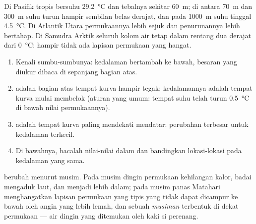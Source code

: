 Di Pasifik tropis  bersuhu \qty{29.2}{\degreeCelsius} dan
tebalnya sekitar \qty{60}{m}; di antara \qty{70}{m} dan \qty{300}{m} suhu
turun hampir sembilan belas derajat, dan pada \qty{1000}{m} suhu tinggal
\qty{4.5}{\degreeCelsius}. Di Atlantik Utara permukaannya lebih sejuk dan
penurunannya lebih bertahap. Di Samudra Arktik seluruh kolom air tetap dalam
rentang dua derajat dari \qty{0}{\degreeCelsius}: hampir tidak ada lapisan
permukaan yang hangat.

\begin{method}\label{met:g10:layered-ocean:profile}
\begin{enumerate}
  \item Kenali sumbu-sumbunya: kedalaman bertambah ke bawah, besaran yang
        diukur dibaca di sepanjang bagian atas.
  \item {} adalah bagian atas tempat kurva hampir tegak;
        kedalamannya adalah tempat kurva mulai membelok (aturan yang umum:
        tempat suhu telah turun \qty{0.5}{\degreeCelsius} di bawah nilai
        permukaannya).
  \item {} adalah tempat kurva paling mendekati mendatar: perubahan
        terbesar untuk kedalaman terkecil.
  \item Di bawahnya, bacalah nilai-nilai dalam dan bandingkan lokasi-lokasi
        pada kedalaman yang sama.
\end{enumerate}
\end{method}

 berubah menurut musim. Pada musim dingin permukaan
kehilangan kalor, badai mengaduk laut, dan  menjadi lebih
dalam; pada musim panas Matahari menghangatkan lapisan permukaan yang tipis
yang tidak dapat dicampur ke bawah oleh angin yang lebih lemah, dan sebuah
\emph{ musiman} terbentuk di dekat permukaan --- air dingin yang
ditemukan oleh kaki si perenang.

